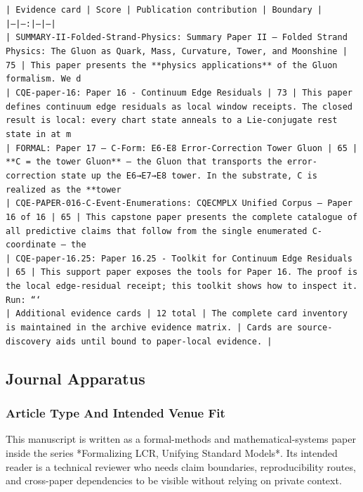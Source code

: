 \documentclass[11pt]{article}
\begin{document}
\noindent\texttt{| Evidence card | Score | Publication contribution | Boundary |}\\
\noindent\texttt{|---|---:|---|---|}\\
\noindent\texttt{| SUMMARY-II-Folded-Strand-Physics: Summary Paper II — Folded Strand Physics: The Gluon as Quark, Mass, Curvature, Tower, and Moonshine | 75 | This paper presents the **physics applications** of the Gluon formalism. We d}\\
\noindent\texttt{| CQE-paper-16: Paper 16 - Continuum Edge Residuals | 73 | This paper defines continuum edge residuals as local window receipts. The closed result is local: every chart state anneals to a Lie-conjugate rest state in at m}\\
\noindent\texttt{| FORMAL: Paper 17 — C-Form: E6-E8 Error-Correction Tower Gluon | 65 | **C = the tower Gluon** — the Gluon that transports the error-correction state up the E6→E7→E8 tower. In the substrate, C is realized as the **tower }\\
\noindent\texttt{| CQE-PAPER-016-C-Event-Enumerations: CQECMPLX Unified Corpus — Paper 16 of 16 | 65 | This capstone paper presents the complete catalogue of all predictive claims that follow from the single enumerated C-coordinate — the}\\
\noindent\texttt{| CQE-paper-16.25: Paper 16.25 - Toolkit for Continuum Edge Residuals | 65 | This support paper exposes the tools for Paper 16. The proof is the local edge-residual receipt; this toolkit shows how to inspect it. Run: ```}\\
\noindent\texttt{| Additional evidence cards | 12 total | The complete card inventory is maintained in the archive evidence matrix. | Cards are source-discovery aids until bound to paper-local evidence. |}\\

\subsection*{Journal Apparatus}

\subsubsection*{Article Type And Intended Venue Fit}

This manuscript is written as a formal-methods and mathematical-systems paper
inside the series *Formalizing LCR, Unifying Standard Models*. Its intended
reader is a technical reviewer who needs claim boundaries, reproducibility
routes, and cross-paper dependencies to be visible without relying on private
context.
\end{document}
